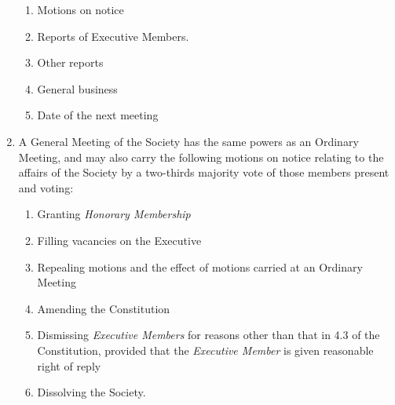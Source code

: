 \documentclass[11pt]{article}
\begin{document}
\begin{enumerate}[\thesection .1]
\begin{enumerate}[\hspace{5mm}1.]
    	\item Motions on notice
    	\item Reports of Executive Members.
    	\item Other reports
    	\item General business
    	\item Date of the next meeting
    \end{enumerate}
    \item A General Meeting of the Society has the same powers as an Ordinary Meeting, and may also carry the following motions on notice relating to the affairs of the Society by a two-thirds majority vote of those members present and voting:
    \begin{enumerate}[\hspace{5mm}i)]
        \item Granting \textit{Honorary Membership}
        \item Filling vacancies on the Executive
        \item Repealing motions and the effect of motions carried at an Ordinary Meeting
        \item Amending the Constitution
        \item Dismissing \textit{Executive Members} for reasons other than that in 4.3 of the Constitution, provided that the \textit{Executive Member} is given reasonable right of reply
        \item Dissolving the Society.
    \end{enumerate}
\end{enumerate}
\end{document}

